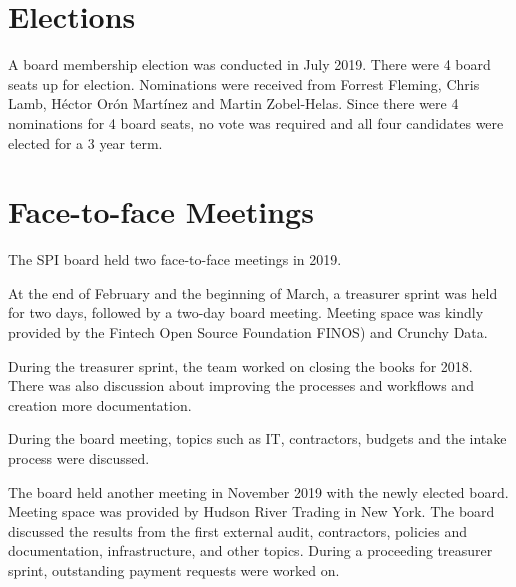 \documentclass[a4paper]{report}
\begin{document}
\section{Elections}

A board membership election was conducted in July 2019.  There were 4
board seats up for election.  Nominations were received from Forrest
Fleming, Chris Lamb, Héctor Orón Martínez and Martin Zobel-Helas.  Since
there were 4 nominations for 4 board seats, no vote was required and all
four candidates were elected for a 3 year term.

\section{Face-to-face Meetings}

The SPI board held two face-to-face meetings in 2019.

At the end of February and the beginning of March, a treasurer sprint
was held for two days, followed by a two-day board meeting.  Meeting
space was kindly provided by the Fintech Open Source Foundation
FINOS) and Crunchy Data.

During the treasurer sprint, the team worked on closing the books
for 2018.  There was also discussion about improving the processes
and workflows and creation more documentation.

During the board meeting, topics such as IT, contractors, budgets
and the intake process were discussed.

The board held another meeting in November 2019 with the newly
elected board.  Meeting space was provided by Hudson River Trading
in New York.  The board discussed the results from the first external
audit, contractors, policies and documentation, infrastructure,
and other topics.  During a proceeding treasurer sprint, outstanding
payment requests were worked on.
\end{document}
